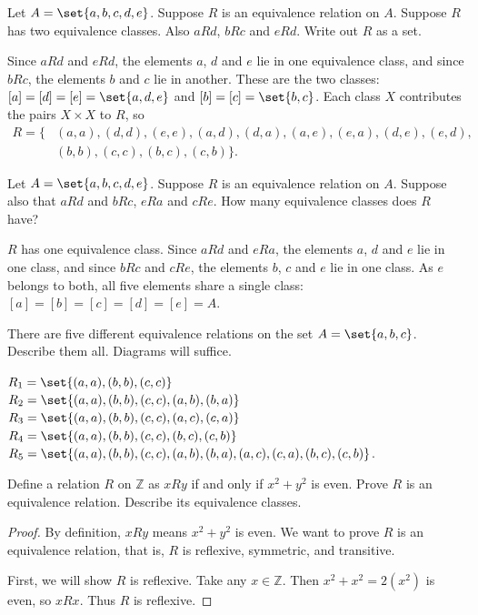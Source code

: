 \documentclass[DIN, pagenumber=false, fontsize=11pt, parskip=half]{scrartcl}
\begin{document}
\begin{problems}
    \problem Let $A = \set{a,b,c,d,e}$. Suppose $R$ is an equivalence relation on $A$. Suppose $R$ has two equivalence classes. Also $aRd$, $bRc$ and $eRd$. Write out $R$ as a set.

    \answer Since $aRd$ and $eRd$, the elements $a$, $d$ and $e$ lie in one equivalence class, and since $bRc$, the elements $b$ and $c$ lie in another. These are the two classes: $[a] = [d] = [e] = \set{a,d,e}$ and $[b] = [c] = \set{b,c}$. Each class $X$ contributes the pairs $X \times X$ to $R$, so
    \begin{align*}
        R = \{ & (a,a),(d,d),(e,e),(a,d),(d,a),(a,e),(e,a),(d,e),(e,d),\\
               & (b,b),(c,c),(b,c),(c,b) \}.
    \end{align*}

    \problem Let $A = \set{a,b,c,d,e}$. Suppose $R$ is an equivalence relation on $A$. Suppose also that $aRd$ and $bRc$, $eRa$ and $cRe$. How many equivalence classes does $R$ have?

    \answer $R$ has one equivalence class. Since $aRd$ and $eRa$, the elements $a$, $d$ and $e$ lie in one class, and since $bRc$ and $cRe$, the elements $b$, $c$ and $e$ lie in one class. As $e$ belongs to both, all five elements share a single class: $[a] = [b] = [c] = [d] = [e] = A$.

    \problem There are five different equivalence relations on the set $A = \set{a,b,c}$. Describe them all. Diagrams will suffice.

    \answer $R_1 = \set{(a,a),(b,b),(c,c)}$\\ 
    $R_2 = \set{(a,a),(b,b),(c,c),(a,b),(b,a)}$\\ 
    $R_3 = \set{(a,a),(b,b),(c,c),(a,c),(c,a)}$\\ 
    $R_4 = \set{(a,a),(b,b),(c,c),(b,c),(c,b)}$\\ 
    $R_5 = \set{(a,a),(b,b),(c,c),(a,b),(b,a),(a,c),(c,a),(b,c),(c,b)}$.

    \problem Define a relation $R$ on $\mathbb{Z}$ as $xRy$ if and only if $x^2 + y^2$ is even. Prove $R$ is an equivalence relation. Describe its equivalence classes.
    
    \begin{proof}
        By definition, $xRy$ means $x^2 + y^2$ is even. We want to prove $R$ is an equivalence relation, that is, $R$ is reflexive, symmetric, and transitive.

        First, we will show $R$ is reflexive. 
        Take any $x \in \mathbb{Z}$.
        Then $x^2 + x^2 = 2(x^2)$ is even, so $xRx$. Thus $R$ is reflexive. 


\end{proof}
\end{problems}
\end{document}
